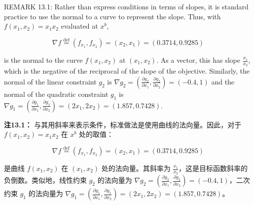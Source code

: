 \begin{original}
REMARK 13.1: Rather than express conditions in terms of slopes, it is standard practice to use the normal to a curve to represent the slope. Thus, with $f(x_1, x_2) = x_1x_2$ evaluated at $x^b$,

\[
\nabla f \overset{\text{def}}{=} (f_{x_1}, f_{x_2}) = (x_2, x_1) = (0.3714, 0.9285)
\]

is the normal to the curve $f(x_1, x_2)$ at $(x_1, x_2)$. As a vector, this has slope $\frac{x_1}{x_2}$, which is the negative of the reciprocal of the slope of the objective. Similarly, the normal of the linear constraint $g_2$ is $\nabla g_2 = (\frac{\partial g_2}{\partial x_1}, \frac{\partial g_2}{\partial x_2}) = (-0.4,1)$ and the normal of the quadratic constraint $g_1$ is $\nabla g_1 = (\frac{\partial g_1}{\partial x_1}, \frac{\partial g_1}{\partial x_2}) = (2x_1,2x_2) = (1.857,0.7428)$.
\end{original}
\begin{translation}
\textbf{注13.1：} 与其用斜率来表示条件，标准做法是使用曲线的法向量。因此，对于 $f(x_1, x_2) = x_1x_2$ 在 $x^b$ 处的取值：

\[
\nabla f \overset{\text{def}}{=} (f_{x_1}, f_{x_2}) = (x_2, x_1) = (0.3714, 0.9285)
\]

是曲线 $f(x_1, x_2)$ 在 $(x_1, x_2)$ 处的法向量。其斜率为 $\frac{x_1}{x_2}$，这是目标函数斜率的负倒数。类似地，线性约束 $g_2$ 的法向量为 $\nabla g_2 = (\frac{\partial g_2}{\partial x_1}, \frac{\partial g_2}{\partial x_2}) = (-0.4,1)$，二次约束 $g_1$ 的法向量为 $\nabla g_1 = (\frac{\partial g_1}{\partial x_1}, \frac{\partial g_1}{\partial x_2}) = (2x_1,2x_2) = (1.857,0.7428)$。
\end{translation}

